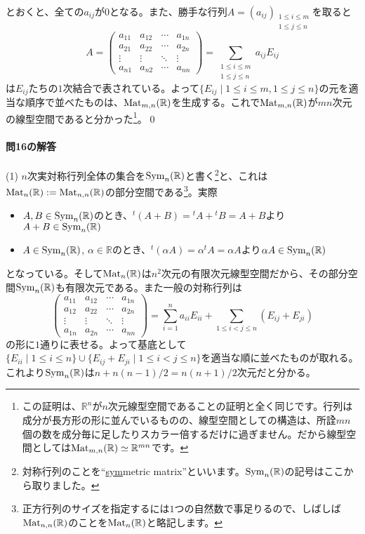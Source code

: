 とおくと、全ての$a_{ij}$が$0$となる。また、勝手な行列$A = (a_{ij})_{\substack{1\leq i\leq m\\ 1\leq j\leq n}}$を取ると
\[
A = 
\begin{pmatrix}
a_{11} & a_{12} & \cdots & a_{1n} \\
a_{21} & a_{22} & \cdots & a_{2n} \\
\vdots & \vdots & \ddots & \vdots \\
a_{n1} & a_{n2} & \cdots & a_{nn}
\end{pmatrix}
= \sum_{\substack{1 \leq i \leq m \\ 1 \leq j \leq n}} a_{ij} E_{ij}
\]
は$E_{ij}$たちの$1$次結合で表されている。よって$\{E_{ij}\mid 1\leq i \leq m, 1\leq j \leq n\}$の元を適当な順序で並べたものは、$\operatorname{Mat}_{m, n}(\mathbb{R})$を生成する。これで$\operatorname{Mat}_{m, n}(\mathbb{R})$が$mn$次元の線型空間であると分かった\footnote{この証明は、$\mathbb{R}^n$が$n$次元線型空間であることの証明と全く同じです。行列は成分が長方形の形に並んでいるものの、線型空間としての構造は、所詮$mn$個の数を成分毎に足したりスカラー倍するだけに過ぎません。だから線型空間としては$\operatorname{Mat}_{m, n}(\mathbb{R})\simeq\mathbb{R}^{mn}$です。}。\qed

\paragraph{問16の解答} \label{paragraph:symmetric_matrices}

(1) $n$次実対称行列全体の集合を$\operatorname{Sym}_n(\mathbb{R})$と書く\footnote{対称行列のことを``\uline{sym}metric matrix''といいます。$\operatorname{Sym}_n(\mathbb{R})$の記号はここから取りました。}と、これは$\operatorname{Mat}_n(\mathbb{R}) := \operatorname{Mat}_{n, n}(\mathbb{R})$の部分空間である\footnote{正方行列のサイズを指定するには$1$つの自然数で事足りるので、しばしば$\operatorname{Mat}_{n, n}(\mathbb{R})$のことを$\operatorname{Mat}_n(\mathbb{R})$と略記します。}。実際
\begin{itemize}
\item $A, B \in \operatorname{Sym}_n(\mathbb{R})$のとき、${}^t(A + B) = {}^t A + {}^t B = A + B$より$A + B \in \operatorname{Sym}_n(\mathbb{R})$
\item $A \in \operatorname{Sym}_n(\mathbb{R})$, $\alpha \in \mathbb{R}$のとき、${}^t(\alpha A) = \alpha {}^t A = \alpha A$より$\alpha A\in\operatorname{Sym}_n(\mathbb{R})$
\end{itemize}
となっている。そして$\operatorname{Mat}_n(\mathbb{R})$は$n^2$次元の有限次元線型空間だから、その部分空間$\operatorname{Sym}_n(\mathbb{R})$も有限次元である。また一般の対称行列は
\[
\begin{pmatrix}
a_{11} & a_{12} & \cdots & a_{1n} \\
a_{12} & a_{22} & \cdots & a_{2n} \\
\vdots & \vdots & \ddots & \vdots \\
a_{1n} & a_{2n} & \cdots & a_{nn}
\end{pmatrix}
=
\sum_{i = 1}^n a_{ii} E_{ii} + \sum_{1\leq i < j \leq n}(E_{ij} + E_{ji})
\]
の形に$1$通りに表せる。よって基底として$\{E_{ii}\mid 1\leq i \leq n\}\cup\{E_{ij} + E_{ji} \mid 1 \leq i < j \leq n \}$を適当な順に並べたものが取れる。これより$\operatorname{Sym}_n(\mathbb{R})$は$n + n(n - 1)/2 = n(n + 1)/2$次元だと分かる。

